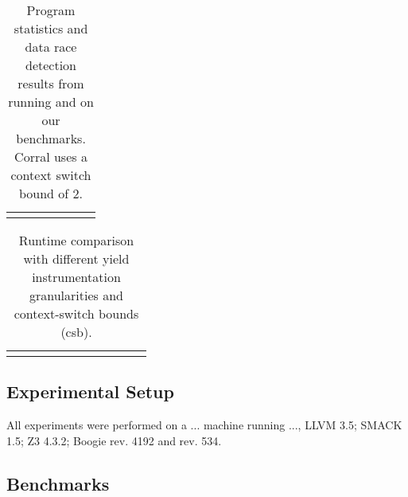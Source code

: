 \newcommand{\colspacing}{\hspace{1.8em}}
\begin{table}[t]
\small
\centering
\setlength{\tabcolsep}{0.3em}
\caption{Program statistics and data race detection results from running \whoop and \corral on our benchmarks. Corral uses a context switch bound of 2.}
\label{tab:stats}
\begin{tabular}{l rrr rr r}
\centering

\end{tabular}
\end{table}

\begin{table*}[t]
\small
\centering
\caption{Runtime comparison with different yield instrumentation granularities and context-switch bounds (csb).}
\label{tab:results}
\begin{tabular}{l rrr rrr rr r r}
\centering

\end{tabular}
\end{table*}

%
%
%

\subsection{Experimental Setup}
\label{eval:setup}

All experiments were performed on a ... machine running ..., LLVM 3.5; SMACK 1.5; Z3 4.3.2; Boogie rev. 4192 and \corral rev. 534.

\subsection{Benchmarks}
\label{eval:benchmarks}

